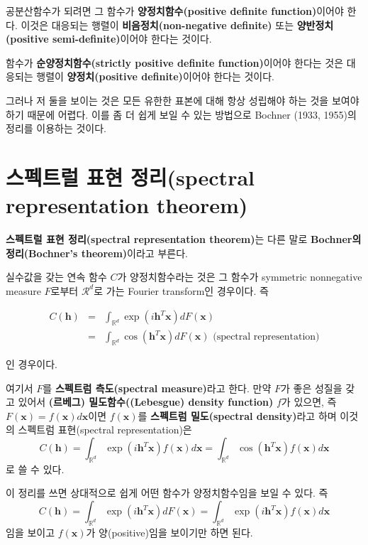 \documentclass[b5paper,]{scrbook}
\theoremstyle{plain}
\theoremstyle{definition}
\numberwithin{equation}{section}
\let\BeginKnitrBlock\begin \let\EndKnitrBlock\end
\begin{document}
공분산함수가 되려면 그 함수가 \textbf{양정치함수(positive definite
function)}이어야 한다. 이것은 대응되는 행렬이
\textbf{비음정치(non-negative definite)} 또는 \textbf{양반정치(positive
semi-definite)}이어야 한다는 것이다.

함수가 \textbf{순양정치함수(strictly positive definite function)}이어야
한다는 것은 대응되는 행렬이 \textbf{양정치(positive definite)}이어야
한다는 것이다.

그러나 저 둘을 보이는 것은 모든 유한한 표본에 대해 항상 성립해야 하는
것을 보여야하기 때문에 어렵다. 이를 좀 더 쉽게 보일 수 있는 방법으로
Bochner (1933, 1955)의 정리를 이용하는 것이다.

\section{스펙트럴 표현 정리(spectral representation
theorem)}\label{--spectral-representation-theorem}

\textbf{스펙트럴 표현 정리(spectral representation theorem)}는 다른 말로
\textbf{Bochner의 정리(Bochner's theorem)}이라고 부른다.

\BeginKnitrBlock{theorem}[스펙트럴 표현 정리]
\protect\hypertarget{thm:unnamed-chunk-206}{}{\label{thm:unnamed-chunk-206}
{} }실수값을 갖는 연속 함수 \(C\)가
양정치함수라는 것은 그 함수가 symmetric nonnegative measure \(F\)로부터
\(\mathcal{R}^{d}\)로 가는 Fourier transform인 경우이다. 즉

\begin{eqnarray}
C(\mathbf{h})&=&\int_{\mathbb{R}^{d}}\exp(i\mathbf{h}^{T}\mathbf{x})dF(\mathbf{x})\nonumber\\
&=&\int_{\mathbb{R}^{d}}\cos(\mathbf{h}^{T}\mathbf{x})dF(\mathbf{x}) \text{ (spectral representation)}
\end{eqnarray}

인 경우이다.
\EndKnitrBlock{theorem}

여기서 \(F\)를 \textbf{스펙트럼 측도(spectral measure)}라고 한다. 만약
\(F\)가 좋은 성질을 갖고 있어서 \textbf{(르베그) 밀도함수((Lebesgue)
density function)} \(f\)가 있으면, 즉
\(F(\mathbf{x})=f(\mathbf{x})d\mathbf{x}\)이면 \(f(\mathbf{x})\)를
\textbf{스펙트럼 밀도(spectral density)}라고 하며 이것의 스펙트럼
표현(spectral representation)은 \[
C(\mathbf{h})=\int_{\mathbb{R}^{d}}\exp(i\mathbf{h}^{T}\mathbf{x})f(\mathbf{x})d\mathbf{x}=\int_{\mathbb{R}^{d}}\cos(\mathbf{h}^{T}\mathbf{x})f(\mathbf{x})d\mathbf{x}
\] 로 쓸 수 있다.

이 정리를 쓰면 상대적으로 쉽게 어떤 함수가 양정치함수임을 보일 수 있다.
즉 \[
C(\mathbf{h}) =\int_{\mathbb{R}^{d}}\exp(i\mathbf{h}^{T}\mathbf{x})dF(\mathbf{x})
=\int_{\mathbb{R}^{d}}\exp(i\mathbf{h}^{T}\mathbf{x})f(\mathbf{x})d\mathbf{x}
\] 임을 보이고 \(f(\mathbf{x})\)가 양(positive)임을 보이기만 하면 된다.
\end{document}
